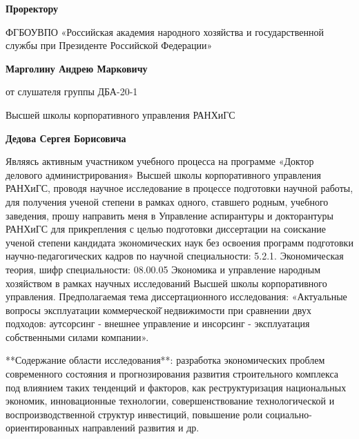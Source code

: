 \begin{flushright}
\color{blue}
\item\textbf{Проректору}
\item ФГБОУВПО «Российская академия народного хозяйства и государственной службы при Президенте Российской Федерации»
\item\textbf{Марголину Андрею Марковичу}

\color{cyan}
\item от слушателя группы ДБА-20-1
\item Высшей школы корпоративного управления РАНХиГС
\item\textbf{Дедова Сергея  Борисовича}
\end{flushright}
\medskip

\begin{center}
\end{center}

Являясь активным участником учебного процесса на программе «Доктор делового администрирования» Высшей школы корпоративного управления РАНХиГС, проводя научное исследование в процессе подготовки научной работы, для получения ученой степени в рамках одного, ставшего родным, учебного заведения, прошу направить меня в Управление аспирантуры и докторантуры РАНХиГС для прикрепления с целью подготовки диссертации на соискание ученой степени кандидата экономических наук без освоения программ подготовки научно-педагогических кадров по научной специальности: 5.2.1. Экономическая теория, шифр специальности: 08.00.05 Экономика и управление народным хозяйством в рамках научных исследований Высшей школы корпоративного управления. Предполагаемая тема диссертационного исследования: «Актуальные вопросы эксплуатации коммерческой̆ недвижимости при сравнении двух подходов: аутсорсинг - внешнее управление и инсорсинг - эксплуатация собственными силами компании».

**Содержание области исследования**: разработка экономических проблем современного состояния и прогнозирования развития строительного комплекса под влиянием таких тенденций и факторов, как реструктуризация национальных экономик, инновационные технологии, совершенствование технологической и воспроизводственной структур инвестиций, повышение роли социально-ориентированных направлений развития и др.

{\aim{}}

{\influence{}}

